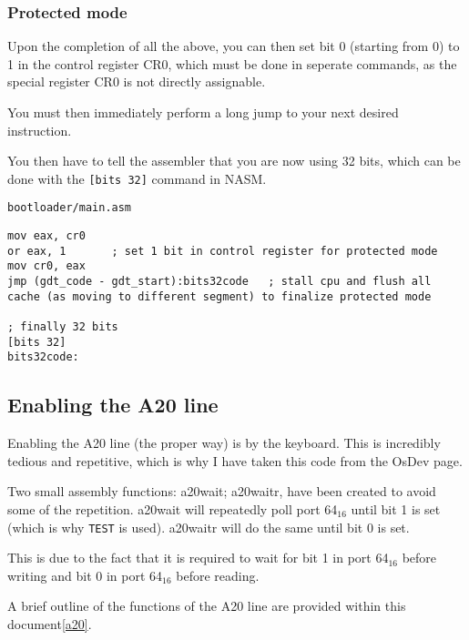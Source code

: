 \documentclass{article}
\begin{document}
\subsubsection{Protected mode}

Upon the completion of all the above, you can then set bit 0 (starting from 0)
to 1 in the control register CR0\cite{intel protected mode enable}, which must be done
in seperate commands, as the special register CR0 is not directly assignable\cite{segment cpu write instruction}.

You must then immediately\cite{intel protected mode enable} perform a long jump
to your next desired instruction.

You then have to tell the assembler that you are now using 32 bits, which can
be done with the \verb|[bits 32]| command in NASM.

\begin{verbatim}
bootloader/main.asm
\end{verbatim}
\begin{verbatim}
mov eax, cr0
or eax, 1		; set 1 bit in control register for protected mode
mov cr0, eax
jmp (gdt_code - gdt_start):bits32code	; stall cpu and flush all cache (as moving to different segment) to finalize protected mode

; finally 32 bits
[bits 32]
bits32code:
\end{verbatim}

\subsection{Enabling the A20 line}

Enabling the A20 line (the proper way) is by the keyboard\cite{a20}. This is
incredibly tedious and repetitive, which is why I have taken
this code from the OsDev page.

Two small assembly functions: a20wait; a20waitr, have been created
to avoid some of the repetition. a20wait will repeatedly poll
port 64$_{16}$ until bit 1 is set (which is why \verb|TEST| is used).
a20waitr will do the same until bit 0 is set.

This is due to the fact that it is required to wait for bit 1 in port
64$_{16}$ before writing and bit 0 in port 64$_{16}$ before reading.

A brief outline of the functions of the A20 line are provided
within this document\ref{a20}.
\end{document}
